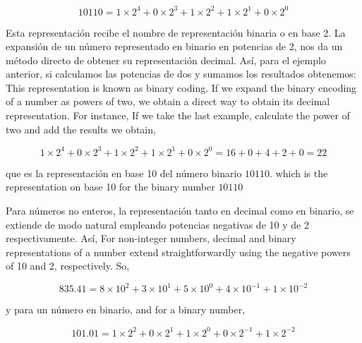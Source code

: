 \begin{equation*}
10110 = 1\times2^4+0\times2^3+1\times2^2+1\times2^1+0\times2^0 
\end{equation*}
\begin{paracol}{2}
Esta representación recibe el nombre de representación binaria o en base 2.
La expansión de un número representado en binario en potencias de 2, nos da un método directo de obtener su representación decimal. Así, para el ejemplo anterior, si calculamos las potencias de dos y sumamos los resultados obtenemos:
\switchcolumn
This representation is known as binary coding.  If we expand the binary encoding of a number as powers of two, we obtain a direct way to obtain its decimal representation. For instance, If we take the last example, calculate the power of two and add the results we obtain,
\end{paracol}
  \begin{equation*} 1\times2^4+0\times2^3+1\times2^2+1\times2^1+0\times2^0=16+0+4+2+0=22 
\end{equation*}
\begin{paracol}{2}
que es la representación en base 10 del número binario $10110$.
\switchcolumn
which is the representation on base 10 for the binary number $10110$
\end{paracol}
\begin{paracol}{2}
Para números no enteros, la representación tanto en decimal como en binario, se extiende de modo natural empleando potencias negativas de 10 y de 2 respectivamente. Así,
\switchcolumn
For non-integer numbers, decimal and binary representations of a number extend straightforwardly using the negative powers of 10 and 2, respectively. So,   
\end{paracol}
\begin{equation} \nonumber
835.41 = 8\times10^2+3\times10^1+5\times10^0+4\times10^{-1}+1\times10^{-2} 
\end{equation}
\begin{paracol}{2}
y para un número en binario,
\switchcolumn
and for a binary number,
\end{paracol}

\begin{equation} \nonumber
101.01 = 1\times2^2+0\times2^1+1\times2^0+0\times2^{-1}+1\times2^{-2} 
\end{equation}

